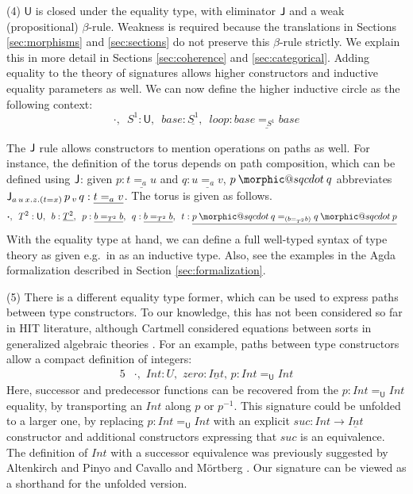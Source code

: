 \documentclass[dvipsnames]{lmcs} %
\makeatletter
\DeclareRobustCommand{\sqcdot}{\mathbin{\mathpalette\morphic@sqcdot\relax}}
\newcommand{\morphic@sqcdot}[2]{%
  \sbox\z@{$\m@th#1\centerdot$}%
  \ht\z@=.33333\ht\z@
  \vcenter{\box\z@}%
}
\newcommand{\U}{\mathsf{U}}
\newcommand{\ra}{\rightarrow}
\newcommand{\1}{\mathsf{1}} \renewcommand{\Pr}{\mathsf{Pr}}
\theoremstyle{plain}\newtheorem{satz}[thm]{Satz} %
\makeatother
\begin{document}
(4) $\U$ is closed under the equality type, with eliminator $\mathsf{J}$ and a weak
(propositional) $\beta$-rule. Weakness is required because the translations in
Sections \ref{sec:morphisms} and \ref{sec:sections} do not preserve this
$\beta$-rule strictly. We explain this in more detail in Sections
\ref{sec:coherence} and \ref{sec:categorical}. Adding equality to the theory of
signatures allows higher constructors and inductive equality parameters as well. We
can now define the higher inductive circle as the following context:
\[
\boldsymbol{\cdot},\,\,\,S^1:\U,\,\,\,base:\underline{S^1},\,\,\,loop:\underline{base =_{S^1} base}
\]

The $\mathsf{J}$ rule allows constructors to mention operations on paths as well. For
instance, the definition of the torus depends on path composition, which can be
defined using $\mathsf{J}$: given $p:\underline{t=_a u}$ and $q:\underline{u=_a v}$, $p
\sqcdot q$ abbreviates $\mathsf{J}_{a\,u\,x.z.(t=x)}\,p\,_v\,q : \underline{t=_a
  v}$. The torus is given as follows.
\begin{alignat*}{5}
  & \boldsymbol{\cdot},\,\,\,T^2:\U,\,\,\,b : \underline{T^2},\,\,\, p:\underline{b =_{T^2} b},\,\,\,q:\underline{b=_{T^2} b},\,\,\, t:\underline{p\sqcdot q=_{(b=_{T^2} b)} q\sqcdot p}
\end{alignat*}
With the equality type at hand, we can define a full well-typed syntax of type
theory as given e.g.\ in \cite{ttintt} as an inductive type.  Also, see the
examples in the Agda formalization described in Section
\ref{sec:formalization}.

(5) There is a different equality type former, which can be used to express
paths between type constructors. To our knowledge, this has not been considered
so far in HIT literature, although Cartmell considered equations between sorts
in generalized algebraic theories \cite{gat}. For an example, paths between type
constructors allow a compact definition of integers:
\begin{alignat*}{5}
  & \boldsymbol{\cdot},\,\,Int : U,\,\,zero : \underline{Int},\,p : Int =_\U Int
\end{alignat*}
Here, successor and predecessor functions can be recovered from the $p : Int
=_\U Int$ equality, by transporting an $Int$ along $p$ or $p^{-1}$. This
signature could be unfolded to a larger one, by replacing $p : Int =_\U Int$
with an explicit $suc : Int \ra \underline{Int}$ constructor and additional
constructors expressing that $suc$ is an equivalence. The definition of $Int$
with a successor equivalence was previously suggested by Altenkirch and Pinyo
\cite{pinyo2018integers} and Cavallo and M\"ortberg \cite{cavallointegers}. Our
signature can be viewed as a shorthand for the unfolded version.
\end{document}
